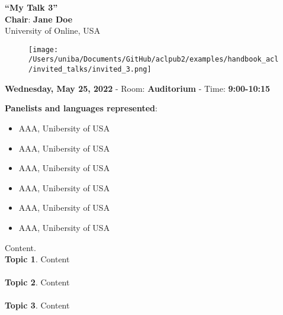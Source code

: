 \begin{center}
  {\Large \textbf{``My Talk 3''}}\\ \vspace*{0.2cm}
   \textbf{Chair}: \textbf{Jane Doe}\\ University of Online, USA
\end{center}
\begin{figure}[h!]
  \centering
      \texttt{[image: /Users/uniba/Documents/GitHub/aclpub2/examples/handbook\_acl/invited\_talks/invited\_3.png]}
\end{figure}
\begin{center}
     {\normalsize \textbf{Wednesday, May 25, 2022} -
 Room: \textbf{Auditorium} -
 Time: \textbf{9:00-10:15}}
\end{center}

\textbf{Panelists and languages represented}:
\begin{itemize}
\vspace{-0.4em}
\item AAA,  Unibersity of USA
\vspace{-0.4em}
\item AAA,  Unibersity of USA
\vspace{-0.4em}
\item AAA,  Unibersity of USA
\vspace{-0.4em}
\item AAA,  Unibersity of USA
\vspace{-0.4em}
\item AAA,  Unibersity of USA
\vspace{-0.4em}
\item AAA,  Unibersity of USA
\end{itemize}

Content.
\\

\textbf{Topic 1}. Content
\\
\\
\textbf{Topic 2}. Content
\\
\\
\textbf{Topic 3}. Content
\\

